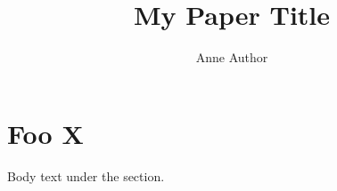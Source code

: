 \documentclass{article}
\title{My Paper Title}
\author{Anne Author}
\begin{document}
\maketitle
\section{Foo X}
Body text under the section.
\end{document}
